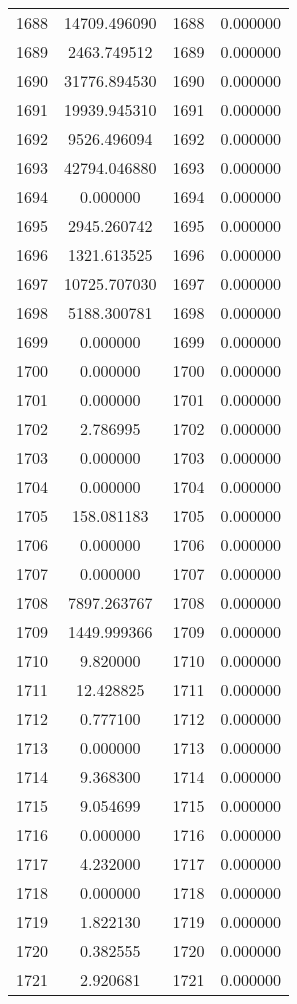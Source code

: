 \documentclass[12pt]{article}
\begin{document}
\begin{longtable}{@{}cccc@{}}
1688 & 14709.496090 & 1688 & 0.000000 \\
1689 & 2463.749512 & 1689 & 0.000000 \\
1690 & 31776.894530 & 1690 & 0.000000 \\
1691 & 19939.945310 & 1691 & 0.000000 \\
1692 & 9526.496094 & 1692 & 0.000000 \\
1693 & 42794.046880 & 1693 & 0.000000 \\
1694 & 0.000000 & 1694 & 0.000000 \\
1695 & 2945.260742 & 1695 & 0.000000 \\
1696 & 1321.613525 & 1696 & 0.000000 \\
1697 & 10725.707030 & 1697 & 0.000000 \\
1698 & 5188.300781 & 1698 & 0.000000 \\
1699 & 0.000000 & 1699 & 0.000000 \\
1700 & 0.000000 & 1700 & 0.000000 \\
1701 & 0.000000 & 1701 & 0.000000 \\
1702 & 2.786995 & 1702 & 0.000000 \\
1703 & 0.000000 & 1703 & 0.000000 \\
1704 & 0.000000 & 1704 & 0.000000 \\
1705 & 158.081183 & 1705 & 0.000000 \\
1706 & 0.000000 & 1706 & 0.000000 \\
1707 & 0.000000 & 1707 & 0.000000 \\
1708 & 7897.263767 & 1708 & 0.000000 \\
1709 & 1449.999366 & 1709 & 0.000000 \\
1710 & 9.820000 & 1710 & 0.000000 \\
1711 & 12.428825 & 1711 & 0.000000 \\
1712 & 0.777100 & 1712 & 0.000000 \\
1713 & 0.000000 & 1713 & 0.000000 \\
1714 & 9.368300 & 1714 & 0.000000 \\
1715 & 9.054699 & 1715 & 0.000000 \\
1716 & 0.000000 & 1716 & 0.000000 \\
1717 & 4.232000 & 1717 & 0.000000 \\
1718 & 0.000000 & 1718 & 0.000000 \\
1719 & 1.822130 & 1719 & 0.000000 \\
1720 & 0.382555 & 1720 & 0.000000 \\
1721 & 2.920681 & 1721 & 0.000000 \\

\end{longtable}
\end{document}
